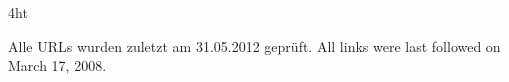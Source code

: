 \documentclass[
               paper=a4,,
               BCOR1.92mm,DIV12,headinclude, %
               bibliography=totoc,
               headsepline,
               cleardoublepage=empty,
               parskip=half,
               final   %
               ]{scrbook}
\let\ifdeutsch\iftrue
\begin{document}
\tableofcontents


\begingroup 
\makeatletter
  \def\@makeschapterhead#1{%
  \vspace*{10\p@}%
  {\parindent \z@ \raggedright \reset@font
            \normalfont \vphantom{\@chapapp{} \thechapter}
        \par\nobreak\vspace*{10\p@}%
        \interlinepenalty\@M
    {\huge \bfseries %
	\ifdeutsch
    \fontfamily{phv}\selectfont
	\fi
	#1\par\nobreak}
\makebox[\textwidth]{\hrulefill}%
    \par\nobreak
    \vskip 5\p@
  }}
\makeatother
\let\cleardoublepage\clearpage
\let\cleardoublepage\relax

\endgroup

\cleardoublepage

\iftex4ht
\else
\fi

\renewcommand*{\chapterpagestyle}{scrplain}
\pagestyle{scrheadings}

%
%
%







%
%
%

%
%
%
\ifdeutsch
\else
\fi

\ifdeutsch
Alle URLs wurden zuletzt am 31.05.2012 gepr\"uft.
\else
All links were last followed on March 17, 2008.
\fi

\backmatter 
\pagestyle{empty}
\renewcommand*{\chapterpagestyle}{empty}
\Versicherung
\end{document}
